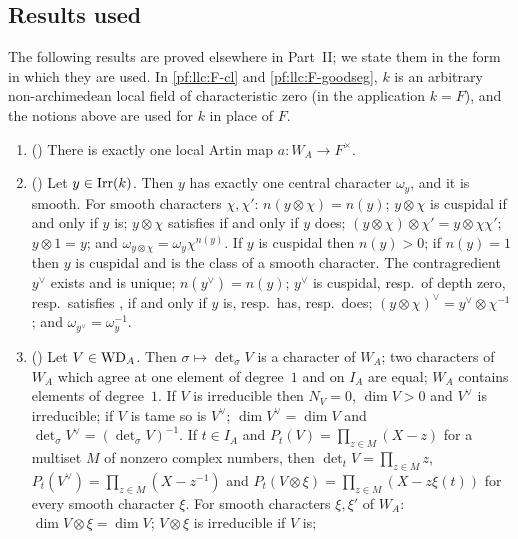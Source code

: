 \subsection{Results used}\label{pf:llc:sec-used}

The following results are proved elsewhere in Part~II; we state them in the form in which they are
used. In \ref{pf:llc:F-cl} and \ref{pf:llc:F-goodseg}, $k$ is an arbitrary non-archimedean local field of
characteristic zero (in the application $k=F$), and the notions above are used for $k$ in place of $F$.
\begin{enumerate}[label=(F\arabic*),leftmargin=3em]
\item\label{pf:llc:F-artex} () There is exactly one local Artin map
  $a\colon W_A\to F^\times$.
\item\label{pf:llc:F-cl} () Let $y\in\operatorname{Irr}(k)$. Then $y$ has
  exactly one central character $\omega_y$, and it is smooth. For smooth characters $\chi,\chi'$:
  $n(y\otimes\chi)=n(y)$; $y\otimes\chi$ is cuspidal if and only if $y$ is; $y\otimes\chi$ satisfies \llcGo{}
  if and only if $y$ does; $(y\otimes\chi)\otimes\chi'=y\otimes\chi\chi'$; $y\otimes1=y$; and
  $\omega_{y\otimes\chi}=\omega_y\chi^{n(y)}$. If $y$ is cuspidal then $n(y)>0$; if $n(y)=1$ then $y$ is
  cuspidal and is the class of a smooth character. The contragredient $y^\vee$ exists and is unique;
  $n(y^\vee)=n(y)$; $y^\vee$ is cuspidal, resp.\ of depth zero, resp.\ satisfies \llcGo{}, if and only if
  $y$ is, resp.\ has, resp.\ does; $(y\otimes\chi)^\vee=y^\vee\otimes\chi^{-1}$; and
  $\omega_{y^\vee}=\omega_y^{-1}$.
\item\label{pf:llc:F-wd} () Let $V\in\mathrm{WD}_A$. Then
  $\sigma\mapsto\det_\sigma V$ is a character of $W_A$; two characters of $W_A$ which agree at one element of
  degree~$1$ and on $I_A$ are equal; $W_A$ contains elements of degree~$1$. If $V$ is irreducible then
  $N_V=0$, $\dim V>0$ and $V^\vee$ is irreducible; if $V$ is tame so is $V^\vee$; $\dim V^\vee=\dim V$ and
  $\det_\sigma V^\vee=(\det_\sigma V)^{-1}$. If $t\in I_A$ and $P_t(V)=\prod_{z\in M}(X-z)$ for a multiset $M$
  of nonzero complex numbers, then $\det_tV=\prod_{z\in M}z$, $P_t(V^\vee)=\prod_{z\in M}(X-z^{-1})$ and
  $P_t(V\otimes\xi)=\prod_{z\in M}(X-z\xi(t))$ for every smooth character $\xi$. For smooth characters
  $\xi,\xi'$ of $W_A$: $\dim V\otimes\xi=\dim V$; $V\otimes\xi$ is irreducible if $V$ is;

\end{enumerate}

